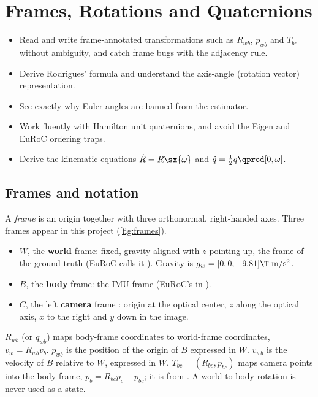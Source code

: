 \chapter{Frames, Rotations and Quaternions}
\label{ch:rotations}

\begin{objectives}
\begin{itemize}
  \item Read and write frame-annotated transformations such as $R_{wb}$, $p_{wb}$ and $T_{bc}$ without
        ambiguity, and catch frame bugs with the adjacency rule.
  \item Derive Rodrigues' formula and understand the axis-angle (rotation vector) representation.
  \item See exactly why Euler angles are banned from the estimator.
  \item Work fluently with Hamilton unit quaternions, and avoid the Eigen and EuRoC ordering traps.
  \item Derive the kinematic equations $\dot R = R\sx{\omega}$ and $\dot q = \tfrac12 q\qprod[0,\omega]$.
\end{itemize}
\end{objectives}

\section{Frames and notation}

A \emph{frame} is an origin together with three orthonormal, right-handed axes. Three frames appear
in this project (\cref{fig:frames}).

\begin{convention}
\begin{itemize}
  \item $W$, the \textbf{world} frame: fixed, gravity-aligned with $z$ pointing up, the frame of the
        ground truth (EuRoC calls it ). Gravity is $g_w = [0, 0, -9.81]\T~\mathrm{m/s^2}$.
  \item $B$, the \textbf{body} frame: the IMU frame  (EuRoC's  in ).
  \item $C$, the left \textbf{camera} frame : origin at the optical center, $z$ along the
        optical axis, $x$ to the right and $y$ down in the image.
\end{itemize}
$R_{wb}$ (or $q_{wb}$) maps body-frame coordinates to world-frame coordinates, $v_w = R_{wb}v_b$.
$p_{wb}$ is the position of the origin of $B$ expressed in $W$. $v_{wb}$ is the velocity of $B$
relative to $W$, expressed in $W$. $T_{bc} = (R_{bc}, p_{bc})$ maps camera points into the body frame,
$p_b = R_{bc}p_c + p_{bc}$; it is  from . A world-to-body rotation is
never used as a state.
\end{convention}

